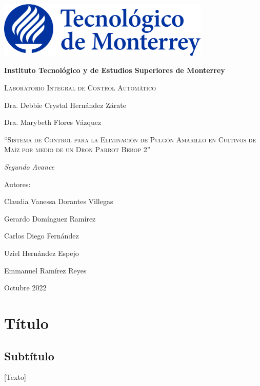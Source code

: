 \documentclass[11pt]{exam}
\begin{document}
    \begin{titlepage}
        \centering
        {\includegraphics[width = 4in]{pictures/itesm-logo.png}\par}
        \vspace{0.4in}
        {\bfseries\LARGE Instituto Tecnol\'ogico y de Estudios Superiores de Monterrey \par}
        \vspace{0.4in}
        {\scshape\Large Laboratorio Integral de Control Automático \par}
        {\Large Dra. Debbie Crystal Hernández Zárate \par}
        {\Large Dra. Marybeth Flores Vázquez \par}
        \vspace{1.2in}
        {\scshape\Large ``Sistema de Control para la Eliminaci\'on de Pulg\'on Amarillo en Cultivos de Maíz por medio de un Dron Parrot Bebop 2'' \par}
        \vspace{1.2in}
        {\itshape\Large Segundo Avance \par}
        \vfill
        {\Large Autores: \par}
        {\Large Claudia Vanessa Dorantes Villegas\par}
        {\Large Gerardo Dom\'inguez Ram\'irez\par}
        {\Large Carlos Diego Fernández\par}
        {\Large Uziel Hernández Espejo\par}
        {\Large Emmanuel Ramírez Reyes\par}
        \vfill
        {\Large Octubre 2022 \par}
    \end{titlepage}

    \headrule
    \footrule

    \section*{T\'itulo}
    \subsection*{Subt\'itulo}
        [Texto]
\end{document}

